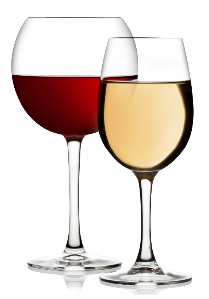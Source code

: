 \documentclass{beamer}
\begin{document}
\begin{frame}
\begin{columns}
\begin{column}{0.5\textwidth}
    \end{column}
    \begin{column}{0.5\textwidth}
      \begin{figure}
      \vspace{-0.5cm}
      \includegraphics[scale=0.6]{./figures/wine.jpg}
      \end{figure}
    \end{column}
    \end{columns}
\end{frame}
\end{document}
